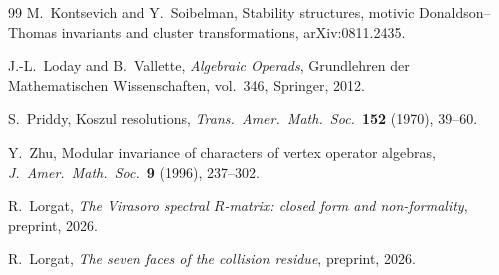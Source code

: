 \documentclass[11pt,reqno]{amsart}
\theoremstyle{definition}
\theoremstyle{remark}
\numberwithin{equation}{section}
\begin{document}
\begin{thebibliography}{99}
M.~Kontsevich and Y.~Soibelman,
Stability structures, motivic Donaldson--Thomas
invariants and cluster transformations,
arXiv:0811.2435.

J.-L.~Loday and B.~Vallette,
\emph{Algebraic Operads},
Grundlehren der Mathematischen Wissenschaften, vol.~346,
Springer, 2012.

S.~Priddy,
Koszul resolutions,
\emph{Trans.\ Amer.\ Math.\ Soc.}~\textbf{152} (1970),
39--60.

Y.~Zhu,
Modular invariance of characters of vertex operator
algebras,
\emph{J.~Amer.\ Math.\ Soc.}~\textbf{9} (1996), 237--302.

R.~Lorgat,
\emph{The Virasoro spectral $R$-matrix: closed form and
non-formality},
preprint, 2026.

R.~Lorgat,
\emph{The seven faces of the collision residue},
preprint, 2026.

\end{thebibliography}
\end{document}
